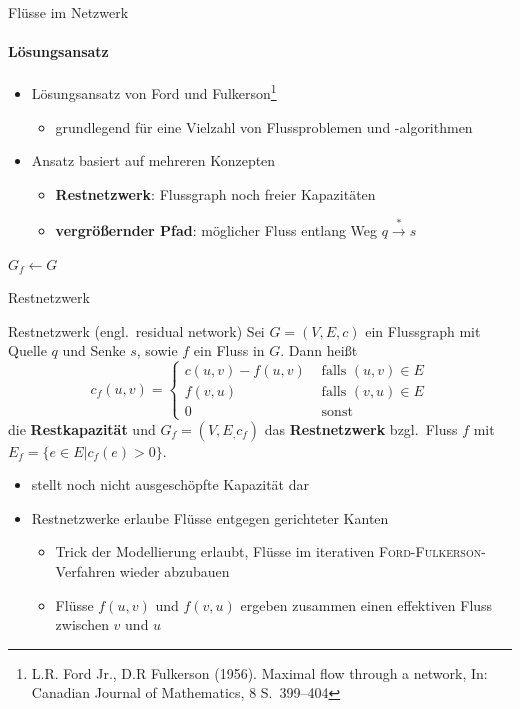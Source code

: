 \documentclass{vorlesung}
\newcommand{\mrk}[1]{\textcolor{ubrot}{\bfseries #1}}
\newcommand{\weg}{\stackrel{*}{\to}}
\begin{document}
\begin{frame}{Flüsse im Netzwerk}
\framesubtitle{Lösungsansatz}
\begin{itemize}
	\item Lösungsansatz von Ford und Fulkerson\footnote{L.R. Ford Jr., D.R Fulkerson (1956). Maximal flow through a network, In: Canadian Journal of Mathematics, 8 S.\ 399--404}
	\begin{itemize}
		\item grundlegend für eine Vielzahl von Flussproblemen und -algorithmen
	\end{itemize}
	\item Ansatz basiert auf mehreren Konzepten
	\begin{itemize}
		\item \mrk{Restnetzwerk}: Flussgraph noch freier Kapazitäten
		\item \mrk{vergrößernder Pfad}: möglicher Fluss entlang Weg $q\weg s$
	\end{itemize}
\end{itemize}
\begin{algorithm}[H]
\DontPrintSemicolon
{}
 $G_f \gets G$
\caption{\textsc{Ford-Fulkerson}}
\end{algorithm}
\end{frame}
%
\begin{frame}{Restnetzwerk}
\begin{block}{Restnetzwerk (engl.\ residual network)}
Sei $G=(V,E,c)$ ein Flussgraph mit Quelle $q$ und Senke $s$, sowie $f$ ein Fluss in $G$. Dann heißt
$$
c_f(u,v) = \left\{\begin{array}{ll}
c(u,v) - f(u,v) & \text{ falls } (u,v)\in E\\
f(v,u) & \text{ falls } (v,u) \in E\\
0 & \text{ sonst}
\end{array}\right.
$$
die \mrk{Restkapazität} und $G_f=(V,E_,c_f)$ das \mrk{Restnetzwerk} bzgl.\ Fluss $f$ mit $E_f = \{e \in E | c_f(e) > 0\}$.
\end{block}
\begin{itemize}
  \item stellt noch nicht ausgeschöpfte Kapazität dar
  \item Restnetzwerke erlaube Flüsse entgegen gerichteter Kanten
  \begin{itemize}
  	\item Trick der Modellierung erlaubt, Flüsse im iterativen \textsc{Ford-Fulkerson}-Verfahren wieder abzubauen
	\item Flüsse $f(u,v)$ und $f(v,u)$ ergeben zusammen einen effektiven Fluss zwischen $v$ und $u$
  \end{itemize}
\end{itemize}
\end{frame}
\end{document}
